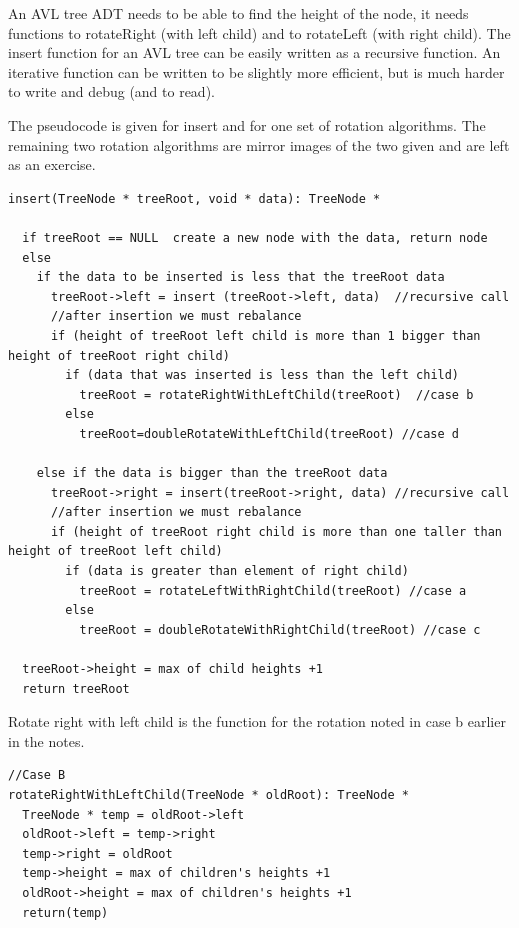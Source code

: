 An AVL tree ADT needs to be able to find the height of the node, it needs functions to rotateRight (with left child) and to rotateLeft (with right child). The insert function for an AVL tree can be easily written as a recursive function. An iterative function can be written to be slightly more efficient, but is much harder to write and debug (and to read).

The pseudocode is given for insert and for one set of rotation algorithms.
The remaining two rotation algorithms are mirror images of the two given and are left as an exercise. 




\begin{lstlisting}
insert(TreeNode * treeRoot, void * data): TreeNode *

  if treeRoot == NULL  create a new node with the data, return node
  else
    if the data to be inserted is less that the treeRoot data
      treeRoot->left = insert (treeRoot->left, data)  //recursive call
      //after insertion we must rebalance
      if (height of treeRoot left child is more than 1 bigger than height of treeRoot right child)
        if (data that was inserted is less than the left child)
          treeRoot = rotateRightWithLeftChild(treeRoot)  //case b
        else
          treeRoot=doubleRotateWithLeftChild(treeRoot) //case d
          
    else if the data is bigger than the treeRoot data
      treeRoot->right = insert(treeRoot->right, data) //recursive call
      //after insertion we must rebalance
      if (height of treeRoot right child is more than one taller than height of treeRoot left child)
        if (data is greater than element of right child)
          treeRoot = rotateLeftWithRightChild(treeRoot) //case a
        else
          treeRoot = doubleRotateWithRightChild(treeRoot) //case c
          
  treeRoot->height = max of child heights +1
  return treeRoot

\end{lstlisting}


Rotate right with left child is the function for the rotation noted in case b earlier in the notes.
\begin{lstlisting}
//Case B
rotateRightWithLeftChild(TreeNode * oldRoot): TreeNode *
  TreeNode * temp = oldRoot->left
  oldRoot->left = temp->right
  temp->right = oldRoot
  temp->height = max of children's heights +1
  oldRoot->height = max of children's heights +1
  return(temp)
\end{lstlisting}


